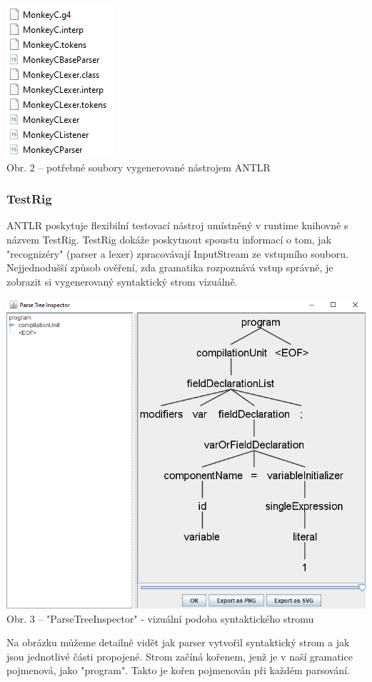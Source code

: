 \documentclass[czech,master,dept460,male,cpp,cpdeclaration]{diploma}
\begin{document}
\begin{center}
	\includegraphics{generated_files}
	\\
	Obr. 2 – potřebné soubory vygenerované nástrojem ANTLR
\end{center}

\subsubsection{TestRig}
ANTLR poskytuje flexibilní testovací nástroj umístněný v runtime knihovně s názvem TestRig. TestRig dokáže poskytnout spoustu informací o tom, jak "recognizéry" (parser a lexer) zpracovávají InputStream ze vstupního souboru.\\
Nejjednodušší způsob ověření, zda gramatika rozpoznává vstup správně, je zobrazit si vygenerovaný syntaktický strom vizuálně.

\begin{center}
	\includegraphics[scale=0.8]{ParseTreeInspector}
	\\
	Obr. 3 – "ParseTreeInspector" - vizuální podoba syntaktického stromu
\end{center}
Na obrázku můžeme detailně vidět jak parser vytvořil syntaktický strom a jak jsou jednotlivé části propojené. Strom začíná kořenem, jenž je v naší gramatice pojmenová, jako "program". Takto je kořen pojmenován při každém parsování. 
\end{document}
